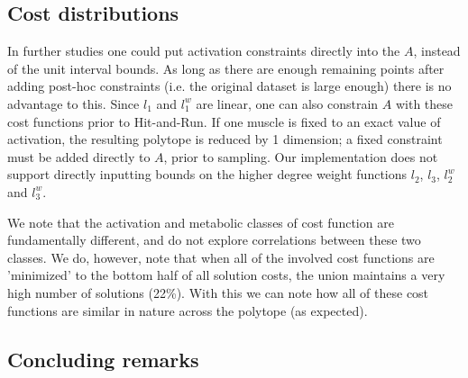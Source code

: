 
\subsection{Cost distributions} %
\label{sec:cost_distributions}
In further studies one could put activation constraints directly into the $A$, instead of the unit interval bounds. As long as there are enough remaining points after adding post-hoc constraints (i.e. the original dataset is large enough) there is no advantage to this.
Since $l_1$ and $l_1^w$ are linear, one can also constrain $A$ with these cost functions prior to Hit-and-Run.
If one muscle is fixed to an exact value of activation, the resulting polytope is reduced by 1 dimension; a fixed constraint must be added directly to $A$, prior to sampling.
Our implementation does not support directly inputting bounds on the higher degree weight functions $l_2$, $l_3$, $l_2^w$ and $l_3^w$.

We note that the activation and metabolic classes of cost function are fundamentally different, and do not explore correlations between these two classes. We do, however, note that when all of the involved cost functions are 'minimized' to the bottom half of all solution costs, the union maintains a very high number of solutions (22\%). With this we can note how all of these cost functions are similar in nature across the polytope (as expected).

\subsection{Concluding remarks} %
\label{ssub:concluding_remarks}

